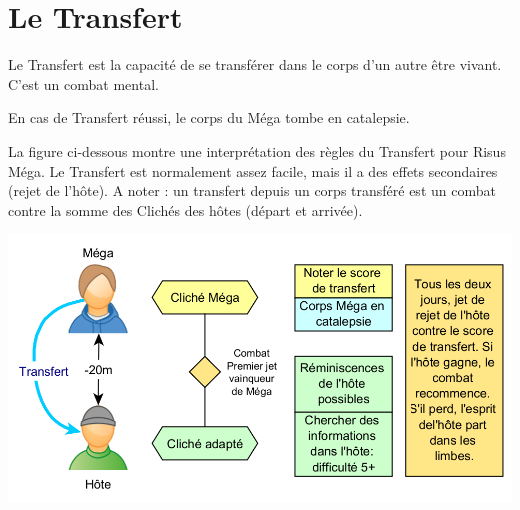 \documentclass[11pt]{article}
\begin{document}
\newpage
\section{Le Transfert}

Le Transfert est la capacité de se transférer dans le corps d'un autre être vivant.  C'est un combat mental.

En cas de Transfert réussi, le corps du Méga tombe en catalepsie.

La figure ci-dessous montre une interprétation des règles du Transfert pour Risus Méga. Le Transfert est normalement assez facile, mais il a des effets secondaires (rejet de l'hôte). A noter : un transfert depuis un corps transféré est un combat contre la somme des Clichés des hôtes (départ et arrivée).


\begin{center}
\includegraphics[scale=.4]{mega-transfert}
\end{center}
\end{document}
